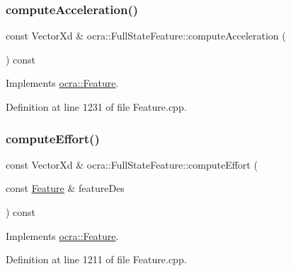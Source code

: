 \subsubsection{\texorpdfstring{compute\+Acceleration()}{computeAcceleration()}\hspace{0.1cm}{\footnotesize\ttfamily [2/2]}}
{\footnotesize\ttfamily const Vector\+Xd \& ocra\+::\+Full\+State\+Feature\+::compute\+Acceleration (\begin{DoxyParamCaption}{ }\end{DoxyParamCaption}) const\hspace{0.3cm}{\ttfamily [virtual]}}



Implements \hyperlink{classocra_1_1Feature_aa42b61d4255116caa92042d01ca36b79}{ocra\+::\+Feature}.



Definition at line 1231 of file Feature.\+cpp.

\hypertarget{classocra_1_1FullStateFeature_aac81e14af36ee0fb2ff24f991a1915eb}{}\label{classocra_1_1FullStateFeature_aac81e14af36ee0fb2ff24f991a1915eb} 
\subsubsection{\texorpdfstring{compute\+Effort()}{computeEffort()}\hspace{0.1cm}{\footnotesize\ttfamily [1/2]}}
{\footnotesize\ttfamily const Vector\+Xd \& ocra\+::\+Full\+State\+Feature\+::compute\+Effort (\begin{DoxyParamCaption}\item[{const \hyperlink{classocra_1_1Feature}{Feature} \&}]{feature\+Des }\end{DoxyParamCaption}) const\hspace{0.3cm}{\ttfamily [virtual]}}



Implements \hyperlink{classocra_1_1Feature_a19626a241666fdae253af1f7b6f2acd7}{ocra\+::\+Feature}.



Definition at line 1211 of file Feature.\+cpp.

\hypertarget{classocra_1_1FullStateFeature_a65b58a3fac72eab7f9bd18cb20775798}{}\label{classocra_1_1FullStateFeature_a65b58a3fac72eab7f9bd18cb20775798} 
